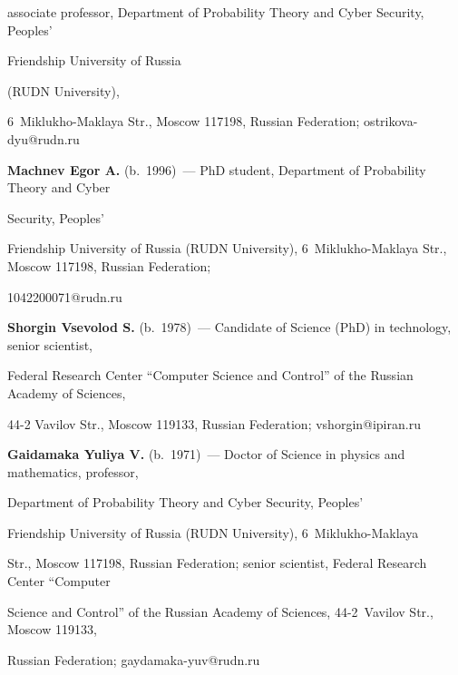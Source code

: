 associate professor, Department of Probability Theory and Cyber Security, Peoples' 


Friendship University of Russia


(RUDN University), 


6~Miklukho-Maklaya Str., Moscow 117198, Russian Federation; \mbox{ostrikova-dyu@rudn.ru}





\vspace*{3pt}


  


  \noindent


\textbf{Machnev Egor A.} (b.\ 1996)~--- PhD student, Department of Probability Theory and Cyber 


Security, Peoples' 


Friendship University of Russia (RUDN University), 6~Miklukho-Maklaya Str., Moscow 117198, Russian Federation; 


\mbox{1042200071@rudn.ru}





\vspace*{3pt}


  


  \noindent


\textbf{Shorgin Vsevolod S.} (b.\ 1978)~--- Candidate of Science (PhD) in technology, senior scientist, 


Federal Research Center ``Computer Science and Control'' of the Russian Academy of Sciences, 


44-2 Vavilov Str., Moscow 119133, Russian Federation; \mbox{vshorgin@ipiran.ru}





\vspace*{3pt}


  


  \noindent


\textbf{Gaidamaka Yuliya V.} (b.\ 1971)~--- Doctor of Science in physics and mathematics, professor, 


Department of Probability Theory and Cyber Security, Peoples' 


Friendship University of Russia (RUDN University), 6~Miklukho-Maklaya 


Str., Moscow 117198, Russian Federation; senior scientist, Federal Research Center ``Computer 


Science and Control'' of the Russian Academy of Sciences, 44-2~Vavilov Str., Moscow 119133, 


Russian Federation; \mbox{gaydamaka-yuv@rudn.ru}








\label{end\stat}





\renewcommand{\bibname}{\protect\rm Литература}    


   


